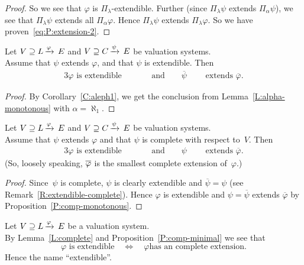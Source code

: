 \documentclass[main.tex]{subfiles}
\begin{document}
\begin{proof}
So we see that $\varphi$ is $\Pi_\lambda$-extendible.
Further
(since $\Pi_\lambda\psi$ extends $\Pi_\alpha \psi$),
we see that $\Pi_\lambda \psi$ extends all $\Pi_\alpha\varphi$.
Hence $\Pi_\lambda \psi$ extends $\Pi_\lambda \varphi$.
So we have proven~\eqref{eq:P:extension-2}.
\end{proof}
%
%
\begin{prop}
\label{P:comp-monotonous}
Let $V \supseteq L\,\smash{\xrightarrow{\varphi}\,E}$
and $V \supseteq C\,\smash{\xrightarrow{\psi}\,E}$
 be valuation systems.\\
Assume that
$\psi$ extends $\varphi$,
and that 
$\psi$ is extendible.
Then 
\begin{alignat*}{3}
\text{$\varphi$ is extendible}
\qquad&&\text{and}\qquad
\text{$\overline\psi$ }&&\text{extends $\overline\varphi$}.
\end{alignat*}
\end{prop}
\begin{proof}
By Corollary~\ref{C:aleph1},
we get the conclusion from
Lemma~\ref{L:alpha-monotonous}
with $\alpha=\aleph_1$.
\end{proof}
%
%
\begin{prop}
\label{P:comp-minimal}
Let $V \supseteq L\,\smash{\xrightarrow{\varphi}\,E}$
and $V \supseteq C\,\smash{\xrightarrow{\psi}\,E}$
 be valuation systems.\\
Assume  that
$\psi$ extends $\varphi$
and that $\psi$ is complete
with respect to~$V$.
Then 
\begin{alignat*}{3}
\text{$\varphi$ is extendible}
\qquad&&\text{and}\qquad
\text{$\psi$ }&&\text{extends $\overline\varphi$}.
\end{alignat*}
(So, loosely speaking,
$\overline\varphi$ is the smallest complete extension of~$\varphi$.)
\end{prop}
\begin{proof}
Since~$\psi$ is complete,
$\psi$ is clearly extendible 
and $\overline\psi = \psi$
(see Remark~\ref{R:extendible-complete}).
Hence $\varphi$ is extendible
and $\psi=\overline\psi$ extends $\overline\varphi$
by Proposition~\ref{P:comp-monotonous}.
\end{proof}
%
%
\begin{rem}
Let $V \supseteq L\,\smash{\xrightarrow{\varphi}\,E}$ be a valuation system.\\
By Lemma~\ref{L:complete} and Proposition~\ref{P:comp-minimal}
we see that
\begin{equation*}
\text{$\varphi$ is extendible}
\quad\iff\quad
\text{$\varphi$
has an complete extension}.
\end{equation*}
Hence the name ``extendible''.
\end{rem}
\end{document}

